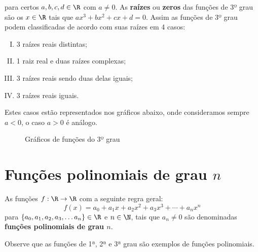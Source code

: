   para certos $a, b, c, d \in \R$ com $a \neq 0$. As \textbf{raízes} ou \textbf{zeros} das funções de 3º grau são os $x \in \R$ tais que $ax^3 + bx^2 + cx + d=0$. Assim as funções de 3º grau podem classificadas de acordo com suas raízes em 4 casos:
 \begin{enumerate}[(I)]
  \item 3 raízes reais distintas;
  \item 1 raiz real e duas raízes complexas;
  \item 3 raízes reais sendo duas delas iguais;
  \item 3 raízes reais iguais.
 \end{enumerate}
 Estes casos estão representados nos gráficos abaixo, onde consideramos sempre $a< 0$, o caso $a> 0$ é análogo.


   \begin{figure}[H]
   \end{figure}

  \begin{figure}[H]
   \caption{Gráficos de funções do 3º grau}
  \end{figure}
  


\section{Funções polinomiais de grau \texorpdfstring{$n$}{n}}

 \vskip0.3cm
 \colorbox{azul}{
 \begin{minipage}{0.9\linewidth}
 \begin{center}
 As funções $f: \R \to \R$ com a seguinte regra geral:
\begin{equation}
f(x) = a_0 + a_1 x + a_2 x^2 + a_3 x^3 + \cdots + a_n x^n
\end{equation}
 para $\{a_0, a_1, a_2, a_3, \ldots a_n\} \in \R$ e $n \in \N$, tais que $a_n \neq 0$ são denominadas \\ \textbf{funções polinomiais de grau $n$}.
 \end{center}
 \end{minipage}}
 \vskip0.3cm

Observe que as funções de 1ª, 2ª e 3ª grau são exemplos de funções polinomiais.

